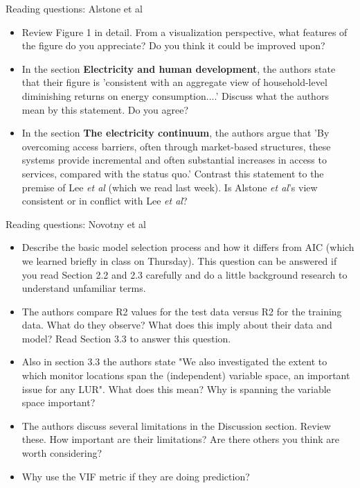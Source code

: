 \documentclass[aspectratio=169]{beamer}
\begin{document}
\begin{frame}{Reading questions: Alstone et al}

\begin{itemize}
\item  Review Figure 1 in detail.  From a visualization perspective, what features of the figure do you appreciate?  Do you think it could be improved upon?
\item In the section \textbf{Electricity and human development}, the authors state that their figure is 'consistent with an aggregate view of household-level diminishing returns on energy consumption....'  Discuss what the authors mean by this statement.  Do you agree?
\item  In the section \textbf{The electricity continuum}, the authors argue that 'By overcoming access barriers, often through market-based structures, these systems provide incremental and often substantial increases in access to services, compared with the status quo.'  Contrast this statement to the premise of Lee \textit{et al} (which we read last week).  Is Alstone \textit{et al}'s view consistent or in conflict with Lee \textit{et al}?  
\end{itemize}

\end{frame}

\begin{frame}{Reading questions: Novotny et al}

\begin{itemize}
\item Describe the basic model selection process and how it differs from AIC (which we learned briefly in class on Thursday). This question can be answered if you read Section 2.2 and 2.3 carefully and do a little background research to understand unfamiliar terms.

\item The authors compare R2 values for the test data versus R2 for the training data. What do they observe? What does this imply about their data and model? Read Section 3.3 to answer this question.

\item Also in section 3.3 the authors state "We also investigated the extent to which monitor locations span the (independent) variable space, an important issue for any LUR". What does this mean? Why is spanning the variable space important?

\item The authors discuss several limitations in the Discussion section. Review these. How important are their limitations? Are there others you think are worth considering?

\item Why use the VIF metric if they are doing prediction?
\end{itemize}
\end{frame}
\end{document}

